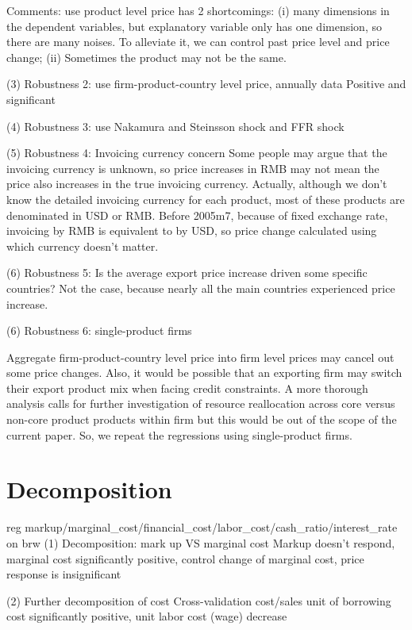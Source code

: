 \documentclass[12pt]{article}
\begin{document}
 

Comments: use product level price has 2 shortcomings: (i) many dimensions in the dependent variables, but explanatory variable only has one dimension, so there are many noises. To alleviate it, we can control past price level and price change; (ii) Sometimes the product may not be the same.

(3) Robustness 2: use firm-product-country level price, annually data
Positive and significant
 

(4) Robustness 3: use Nakamura and Steinsson shock and FFR shock
 

(5) Robustness 4: Invoicing currency concern
Some people may argue that the invoicing currency is unknown, so price increases in RMB may not mean the price also increases in the true invoicing currency. Actually, although we don’t know the detailed invoicing currency for each product, most of these products are denominated in USD or RMB. Before 2005m7, because of fixed exchange rate, invoicing by RMB is equivalent to by USD, so price change calculated using which currency doesn’t matter. 

(6) Robustness 5: Is the average export price increase driven some specific countries?
Not the case, because nearly all the main countries experienced price increase. 
 

(6) Robustness 6: single-product firms

Aggregate firm-product-country level price into firm level prices may cancel out some price changes. Also, it would be possible that an exporting firm may switch their export product mix when facing credit constraints. A more thorough analysis calls for further investigation of resource reallocation across core versus non-core product products within firm but this would be out of the scope of the current paper. So, we repeat the regressions using single-product firms.


\section{Decomposition}

reg markup/marginal_cost/financial_cost/labor_cost/cash_ratio/interest_rate on brw
(1) Decomposition: mark up VS marginal cost 
Markup doesn’t respond, marginal cost significantly positive, control change of marginal cost, price response is insignificant

 

(2) Further decomposition of cost
Cross-validation cost/sales
unit of borrowing cost significantly positive, unit labor cost (wage) decrease
 
\end{document}

